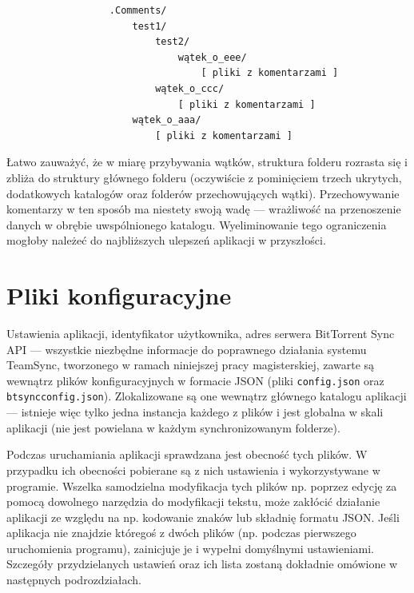 \documentclass[polish,a4paper,twoside]{ppfcmthesis}
\begin{document}
\begin{minipage}{\linewidth}
\vspace{1em}
\begin{verbatim}
                  .Comments/
                      test1/
                          test2/
                              wątek_o_eee/
                                  [ pliki z komentarzami ]
                          wątek_o_ccc/
                              [ pliki z komentarzami ]
                      wątek_o_aaa/
                          [ pliki z komentarzami ]
\end{verbatim}
\vspace{1em}
\end{minipage}

Łatwo zauważyć, że w miarę przybywania wątków, struktura folderu rozrasta się i zbliża do struktury głównego folderu (oczywiście z pominięciem trzech ukrytych, dodatkowych katalogów oraz folderów przechowujących wątki). Przechowywanie komentarzy w ten sposób ma niestety swoją wadę --- wrażliwość na przenoszenie danych w obrębie uwspólnionego katalogu. Wyeliminowanie tego ograniczenia mogłoby należeć do najbliższych ulepszeń aplikacji w przyszłości.

\section{Pliki konfiguracyjne}

Ustawienia aplikacji, identyfikator użytkownika, adres serwera BitTorrent Sync API --- wszystkie niezbędne informacje do poprawnego działania systemu TeamSync, tworzonego w ramach niniejszej pracy magisterskiej, zawarte są wewnątrz plików konfiguracyjnych w formacie JSON (pliki \texttt{config.json} oraz \texttt{btsyncconfig.json}). Zlokalizowane są one wewnątrz głównego katalogu aplikacji --- istnieje więc tylko jedna instancja każdego z plików i jest globalna w skali aplikacji (nie jest powielana w każdym synchronizowanym folderze).

Podczas uruchamiania aplikacji sprawdzana jest obecność tych plików. W przypadku ich obecności pobierane są z nich ustawienia i wykorzystywane w programie. Wszelka samodzielna modyfikacja tych plików np. poprzez edycję za pomocą dowolnego narzędzia do modyfikacji tekstu, może zakłócić działanie aplikacji ze względu na np. kodowanie znaków lub składnię formatu JSON. Jeśli aplikacja nie znajdzie któregoś z dwóch plików (np. podczas pierwszego uruchomienia programu), zainicjuje je i wypełni domyślnymi ustawieniami. Szczegóły przydzielanych ustawień oraz ich lista zostaną dokładnie omówione w następnych podrozdziałach.
\end{document}
